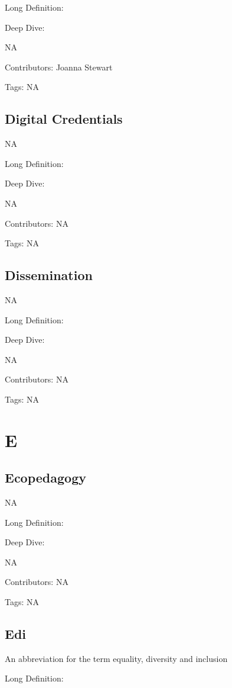 \documentclass[
  letterpaper,
  DIV=11,
  numbers=noendperiod]{scrreprt}
\begin{document}
Long Definition:

Deep Dive:

NA

Contributors: Joanna Stewart

Tags: NA

\section{Digital Credentials}\label{digital-credentials}

NA

Long Definition:

Deep Dive:

NA

Contributors: NA

Tags: NA

\section{Dissemination}\label{dissemination}

NA

Long Definition:

Deep Dive:

NA

Contributors: NA

Tags: NA


\chapter{E}\label{e}

\section{Ecopedagogy}\label{ecopedagogy}

NA

Long Definition:

Deep Dive:

NA

Contributors: NA

Tags: NA

\section{Edi}\label{edi}

An abbreviation for the term equality, diversity and inclusion

Long Definition:
\end{document}

